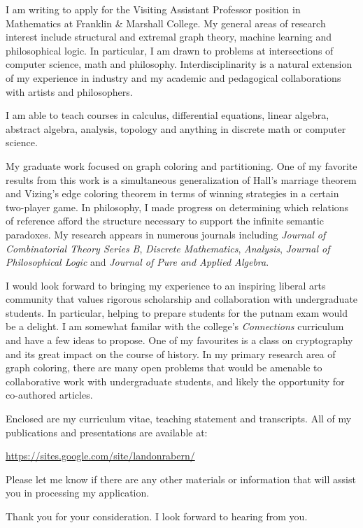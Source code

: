\documentclass[10pt,stdletter,dateno]{newlfm}
\begin{document}
\begin{newlfm}

I am writing to apply for the Visiting Assistant Professor position in Mathematics at Franklin \& Marshall College.
My general areas of research interest include structural and extremal graph theory, machine learning and philosophical logic.  
In particular, I am drawn to problems at intersections of computer science, math and philosophy.  Interdisciplinarity is a natural extension of my experience in industry and 
my academic and pedagogical collaborations with artists and philosophers.  

I am able to teach courses in calculus, differential equations, linear algebra, abstract algebra, analysis, topology and anything in discrete math or computer science.  


My graduate work focused on graph coloring and partitioning.  One of my favorite results from this work is a simultaneous generalization of Hall's marriage 
theorem and Vizing's edge coloring theorem in terms of winning strategies in a certain two-player game.  
In philosophy, I made progress on determining which relations of reference afford the structure necessary to support the infinite semantic paradoxes.  
My research appears in numerous journals including \textit{Journal of Combinatorial Theory Series B}, \emph{Discrete Mathematics}, \textit{Analysis}, \textit{Journal of Philosophical Logic} and \textit{Journal of Pure and Applied Algebra}.

I would look forward to bringing my experience to an inspiring liberal arts community that values rigorous scholarship and collaboration with undergraduate students.  In particular,
helping to prepare students for the putnam exam would be a delight.  I am somewhat familar with the college's \emph{Connections} curriculum and have a few ideas to propose.  One
of my favourites is a class on cryptography and its great impact on the course of history.  In my primary research area of graph coloring, there are many open problems that would
be amenable to collaborative work with undergraduate students, and likely the opportunity for co-authored articles.

Enclosed are my curriculum vitae, teaching statement and transcripts.  
All of my publications and presentations are available at:

\url{https://sites.google.com/site/landonrabern/}

Please let me know if there are any other materials or information that will assist you in processing my application.

Thank you for your consideration.  I look forward to hearing from you.

\end{newlfm}
\end{document}
